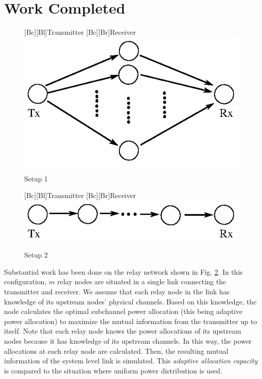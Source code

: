 \documentclass[12]{article}
\begin{document}
\section{Work Completed}
\begin{figure}
\centering
{}[Bc][Bl]{Transmitter}
[Bc][Br]{Receiver}
\includegraphics{setup1.eps}
\caption{Setup 1}
\label{setup1}
\end{figure}
\begin{figure}
\centering
{}[Bc][Bl]{Transmitter}
[Bc][Br]{Receiver}
\includegraphics{setup2.eps}
\caption{Setup 2}
\label{setup2}
\end{figure}
Substantial work has been done on the relay network shown in Fig. \ref{setup2}.  In this configuration, $m$ relay nodes are situated in a single link connecting the transmitter and receiver.  We assume that each relay node in the link has knowledge of its upstream nodes' physical channels.  Based on this knowledge, the node calculates the optimal subchannel power allocation (this being adaptive power allocation) to maximize the mutual information from the transmitter up to itself.  Note that each relay node knows the power allocations of its upstream nodes because it has knowledge of its upstream channels.  In this way, the power allocations at each relay node are calculated.  Then, the resulting mutual information of the system level link is simulated.  This \emph{adaptive allocation capacity} is compared to the situation where uniform power distribution is used.
\end{document}
